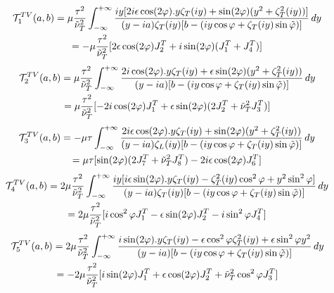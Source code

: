 \begin{multline}
\mathcal{T}_1^{TV}(a,b)= \mu\frac{\tau^2}{\nuti^2_T} \int_{-\infty}^{+\infty} \frac{iy\lbrack 2i\epsilon\cos(2\varphi).y\zeta_T(iy)+\sin(2\varphi)(y^2+\zeta_T^2(iy))\rbrack}{(y-ia)\zeta_T(iy)\lbrack b- (iy\cos \varphi+ \zeta_T(iy)\sin\phiti) \rbrack} \, dy \\
\hfill = -\mu\frac{\tau^2}{\nuti^2_T} \lbrack 2\epsilon\cos(2\varphi) J_2^T+i\sin(2\varphi)(J_1^T+J_4^T)\rbrack \hfill
\end{multline}
\begin{multline}
\mathcal{T}_2^{TV}(a,b)=\mu\frac{\tau^2}{\nuti^2_T} \int_{-\infty}^{+\infty} \frac{2i \cos(2\varphi).y\zeta_T(iy)+\epsilon \sin(2\varphi)(y^2+\zeta_T^2(iy))}{(y-ia)\lbrack b- (iy\cos \varphi+\zeta_T(iy)\sin\phiti )\rbrack} \, dy \\
\hfill=\mu\frac{\tau^2}{\nuti^2_T} \lbrack -2i\cos(2\varphi)J_1^T+\epsilon\sin(2\varphi)(2J_2^T+\nuti_T^2 J_3^T) \rbrack \hfill
\end{multline}
\begin{multline}
\mathcal{T}_3^{TV}(a,b)=-\mu\tau \int_{-\infty}^{+\infty} \frac{ 2i\epsilon\cos(2\varphi).y\zeta_T(iy)+\sin(2\varphi)(y^2+\zeta_T^2(iy))}{(y-ia)\zeta_L(iy)\lbrack b- (iy\cos \varphi+ \zeta_T(iy)\sin \phiti) \rbrack} \, dy \\
\hfill = \mu\tau\lbrack \sin(2\varphi)(2J_7^T+\nuti_T^2J_8^T)-2i\epsilon\cos(2\varphi)J_6^T \rbrack \hfill
\end{multline}
\begin{multline}
\mathcal{T}_4^{TV}(a,b)=2 \mu\frac{\tau^2}{\nuti^2_T} \int_{-\infty}^{+\infty} \frac{iy\lbrack i\epsilon\sin(2\varphi).y\zeta_T(iy)-\zeta_T^2(iy)\cos^2\varphi+y^2\sin^2\varphi \rbrack}{(y-ia)\zeta_T(iy)\lbrack b- (iy\cos \varphi+\zeta_T(iy)\sin\phiti) \rbrack} \, dy \\
\hfill = 2\mu\frac{\tau^2}{\nuti^2_T} \lbrack i\cos^2\varphi J_1^T-\epsilon\sin(2\varphi)J_2^T-i\sin^2\varphi J_4^T \rbrack  \hfill
\end{multline}
\begin{multline}
\mathcal{T}_5^{TV}(a,b)=2\mu\frac{\tau^2}{\nuti^2_T} \int_{-\infty}^{+\infty} \frac{ i\sin(2\varphi).y\zeta_T(iy)-\epsilon \cos^2\varphi \zeta_T^2(iy)+\epsilon \sin^2\varphi y^2}{(y-ia)\lbrack b- (iy\cos \varphi+\zeta_T(iy)\sin\phiti) \rbrack} \, dy \\
\hfill=-2\mu\frac{\tau^2}{\nuti^2_T}\lbrack i\sin(2\varphi)J_1^T+\epsilon\cos(2\varphi)J_2^T+\nuti_T^2\cos^2\varphi J_3^T \rbrack \hfill
\end{multline}
